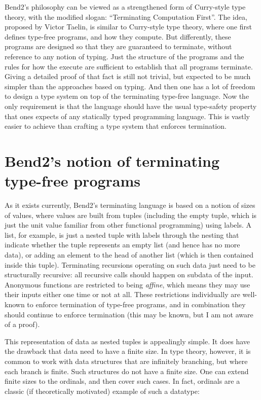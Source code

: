 \documentclass{article}
\begin{document}
Bend2's philosophy can be viewed as a strengthened form of Curry-style
type theory, with the modified slogan: ``Terminating Computation
First''.  The idea, proposed by Victor Taelin, is similar to
Curry-style type theory, where one first defines type-free programs,
and how they compute.  But differently, these programs are designed so
that they are guaranteed to terminate, without reference to any notion
of typing.  Just the structure of the programs and the rules for how
the execute are sufficient to establish that all programs terminate.
Giving a detailed proof of that fact is still not trivial, but
expected to be much simpler than the approaches based on typing.  And
then one has a lot of freedom to design a type system on top of the
terminating type-free language.  Now the only requirement is that the
language should have the usual type-safety property that ones expects
of any statically typed programming language. This is vastly easier to
achieve than crafting a type system that enforces termination.

\section{Bend2's notion of terminating type-free programs}

As it exists currently, Bend2's terminating language is based on a
notion of sizes of values, where values are built from tuples
(including the empty tuple, which is just the unit value familiar from
other functional programming) using labels.  A list, for example, is
just a nested tuple with labels through the nesting that indicate
whether the tuple represents an empty list (and hence has no more
data), or adding an element to the head of another list (which is then
contained inside this tuple).  Terminating recursions operating on
such data just need to be structurally recursive: all recursive calls
should happen on subdata of the input.  Anonymous functions are
restricted to being \emph{affine}, which means they may use their
inputs either one time or not at all.  These restrictions individually
are well-known to enforce termination of type-free programs, and in
combination they should continue to enforce termination (this may be
known, but I am not aware of a proof).

This representation of data as nested tuples is appealingly simple.
It does have the drawback that data need to have a finite size.  In
type theory, however, it is common to work with data structures that
are infinitely branching, but where each branch is finite.  Such
structures do not have a finite size.  One can extend finite sizes to
the ordinals, and then cover such cases.  In fact, ordinals are a
classic (if theoretically motivated) example of such a datatype:
\end{document}
